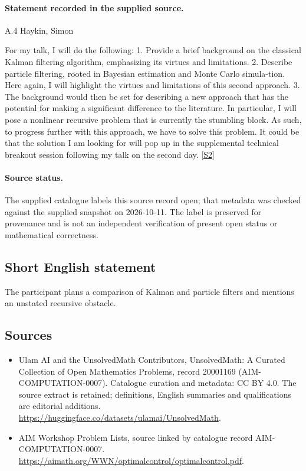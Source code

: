 \documentclass[11pt]{article}
\begin{document}
\paragraph{Statement recorded in the supplied source.}
A.4 Haykin, Simon

For my talk, I will do the following: 1. Provide a brief background on the classical Kalman filtering algorithm, emphasizing its virtues and limitations. 2. Describe particle filtering, rooted in Bayesian estimation and Monte Carlo simula-tion. Here again, I will highlight the virtues and limitations of this second approach. 3. The background would then be set for describing a new approach that has the potential for making a significant difference to the literature. In particular, I will pose a nonlinear recursive problem that is currently the stumbling block. As such, to progress further with this approach, we have to solve this problem. It could be that the solution I am looking for will pop up in the supplemental technical breakout session following my talk on the second day. \href{https://aimath.org/WWN/optimalcontrol/optimalcontrol.pdf}{[S2]}
\paragraph{Source status.}
The supplied catalogue labels this source record open; that metadata was checked against the supplied snapshot on 2026-10-11. The label is preserved for provenance and is not an independent verification of present open status or mathematical correctness.
\subsection{Short English statement}
The participant plans a comparison of Kalman and particle filters and mentions an unstated recursive obstacle.
\subsection{Sources}
\begin{itemize}
\item[S1] Ulam AI and the UnsolvedMath Contributors, UnsolvedMath: A Curated Collection of Open Mathematics Problems, record 20001169 (AIM-COMPUTATION-0007). Catalogue curation and metadata: CC BY 4.0. The source extract is retained; definitions, English summaries and qualifications are editorial additions.
\url{https://huggingface.co/datasets/ulamai/UnsolvedMath}.
\item[S2] AIM Workshop Problem Lists, source linked by catalogue record AIM-COMPUTATION-0007.
\url{https://aimath.org/WWN/optimalcontrol/optimalcontrol.pdf}.
\end{itemize}
\end{document}
